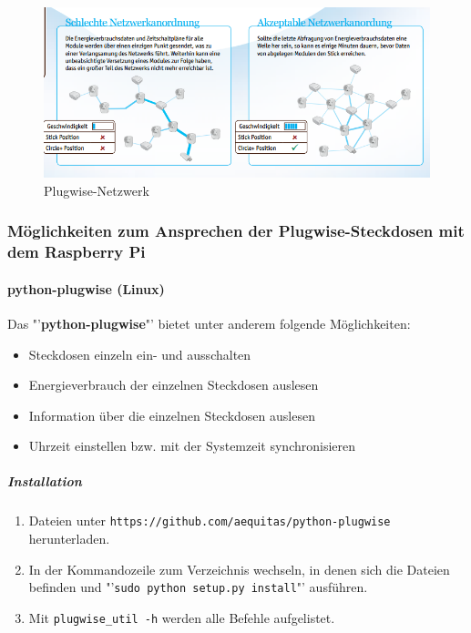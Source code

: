 \begin{figure}[H]
	\centering
	\includegraphics[width=1\textwidth]{Bilder/plugwise-netzwerk}
	\caption{Plugwise-Netzwerk}
	\label{fig:netzwerk}
\end{figure} \mbox{}

\subsubsection{Möglichkeiten zum Ansprechen der Plugwise-Steckdosen mit dem Raspberry Pi} 

\paragraph{python-plugwise (Linux)}

Das "'\textbf{python-plugwise}"' bietet unter anderem folgende Möglichkeiten:

\begin{itemize}
	\item Steckdosen einzeln ein- und ausschalten
	\item Energieverbrauch der einzelnen Steckdosen auslesen
	\item Information über die einzelnen Steckdosen auslesen
	\item Uhrzeit einstellen bzw. mit der Systemzeit synchronisieren
\end{itemize}

\subparagraph{Installation}
\begin{enumerate}
	\item Dateien unter \texttt{https://github.com/aequitas/python-plugwise} herunterladen.
	\item In der Kommandozeile zum Verzeichnis wechseln, in denen sich die Dateien befinden und "'\texttt{sudo python setup.py install}"' ausführen.
	\item Mit \texttt{plugwise\_util -h} werden alle Befehle aufgelistet.
	
\end{enumerate}

